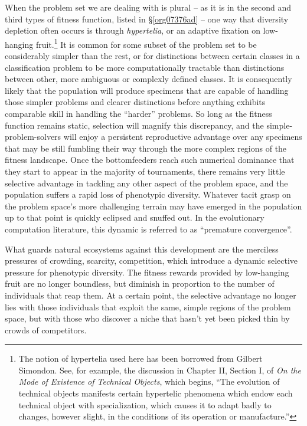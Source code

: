 \documentclass[12pt,glossary]{dalthesis}
\begin{document}
When the problem set we are dealing with is plural -- as it is in the second and third types
of fitness function, listed in \S \ref{org07376ad} -- one way that diversity depletion often
occurs is through \emph{hypertelia}, or an adaptive fixation on low-hanging fruit.\footnote{The notion of hypertelia used here has been borrowed from Gilbert Simondon. See,
  for example, the discussion in Chapter II, Section I, of 
  \emph{On the Mode of Existence of Technical Objects}, which begins, ``The evolution of technical objects manifests certain hypertelic phenomena which
  endow each technical object with specialization, which causes it to adapt badly
  to changes, however slight, in the conditions of its operation or manufacture.''} 
It is common for some subset of the problem set to be considerably simpler than the rest,
or for distinctions between certain classes in a classification problem to be more computationally
tractable than distinctions between other, more ambiguous or complexly defined classes. 
It is consequently likely that the population will produce specimens that are capable of
handling those simpler problems and clearer distinctions before anything exhibits comparable
skill in handling the ``harder'' problems. So long as the fitness function remains static,
selection will magnify this discrepancy, and the simple-problem-solvers will enjoy a persistent
reproductive advantage over any specimens that may be still fumbling their way through the
more complex regions of the fitness landscape. Once the bottomfeeders reach such numerical
dominance that they start to appear in the majority of tournaments, there remains very little
selective advantage in tackling any other aspect of the problem space, and the population
suffers a rapid loss of phenotypic diversity. Whatever tacit grasp on the problem
space's more challenging terrain may have emerged in the population up to that point is
quickly eclipsed and snuffed out. In the evolutionary computation literature, this dynamic
is referred to as ``premature convergence''. 

What guards natural ecosystems against this development are the merciless
pressures of crowding, scarcity, competition, which introduce a dynamic selective
pressure for phenotypic diversity. The fitness rewards provided by low-hanging
fruit are no longer boundless, but diminish in proportion to the number of
individuals that reap them. At a certain point, the selective advantage no longer
lies with those individuals that exploit the same, simple regions of the problem
space, but with those who discover a niche that hasn't yet been picked thin by
crowds of competitors.
\end{document}
